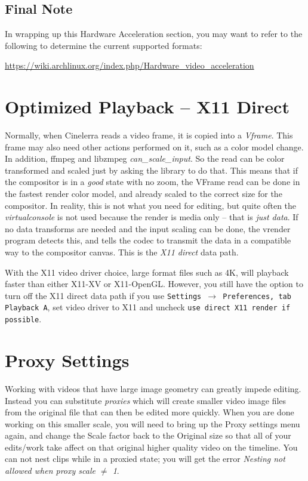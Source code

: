 \subsection{Final Note}%
\label{sub:final_note}

In wrapping up this Hardware Acceleration section, you may want to refer to the following to determine the current supported formats:

\noindent \url{https://wiki.archlinux.org/index.php/Hardware_video_acceleration}

\section{Optimized Playback -- X11 Direct}%
\label{sec:optimized_playback}

Normally, when Cinelerra reads a video frame, it is copied into a \textit{Vframe}.  This frame may also need other actions performed on it, such as a color model change.  In addition, ffmpeg and libzmpeg \textit{can\_scale\_input}.  So the read can be color transformed and scaled just by asking the library to do that.  This means that if the compositor is in a \textit{good} state with no zoom, the VFrame read can be done in the fastest render color model, and already scaled to the correct size for the compositor.  In reality, this is not what you need for editing, but quite often the \textit{virtualconsole} is not used because the render is media only -- that is \textit{just data}.  If no data transforms are needed and the input scaling can be done, the vrender program detects this, and tells the codec to transmit the data in a compatible way to the compositor canvas. This is the \textit{X11 direct} data path.

With the X11 video driver choice, large format files such as 4K, will playback faster than either X11-XV or X11-OpenGL.  However, you still have the option to turn off the X11 direct data path if you use
\texttt{Settings $\rightarrow$ Preferences, tab Playback A}, set video driver to X11 and uncheck \texttt{use direct X11 render if possible}.


\section{Proxy Settings}%
\label{sec:proxy_settings}

Working with videos that have large image geometry can greatly impede editing.  Instead you can substitute \textit{proxies} which will create smaller video image files from the original file that can then be edited more quickly.   When you are done working on this smaller scale, you will need to bring up the Proxy settings menu again, and change the Scale factor back to the Original size so that all of your edits/work take affect on that original higher quality video on the timeline.  You can not nest clips while in a proxied state; you will get the error \textit{Nesting not allowed when proxy scale $\ne$ 1}.

